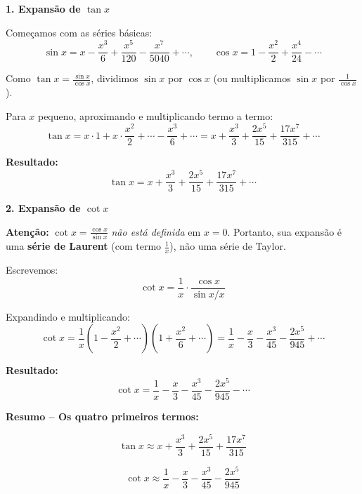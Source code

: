 
\textbf{1. Expansão de $\tan x$}

Começamos com as séries básicas:
\[
\sin x = x - \frac{x^3}{6} + \frac{x^5}{120} - \frac{x^7}{5040}+\cdots,
\qquad
\cos x = 1 - \frac{x^2}{2} + \frac{x^4}{24} - \cdots
\]

Como $\tan x = \frac{\sin x}{\cos x}$, dividimos $\sin x$ por $\cos x$ (ou multiplicamos $\sin x$ por $\frac{1}{\cos x}$). 

Para $x$ pequeno, aproximando e multiplicando termo a termo:
\[
\tan x = x \cdot 1 + x \cdot \frac{x^2}{2} + \cdots - \frac{x^3}{6} + \cdots = x + \frac{x^3}{3} + \frac{2x^5}{15} + \frac{17x^7}{315} + \cdots
\]

\textbf{Resultado:}
\[
\boxed{\tan x = x + \frac{x^3}{3} + \frac{2x^5}{15} + \frac{17x^7}{315} + \cdots}
\]

\textbf{2. Expansão de $\cot x$}

\textbf{Atenção:} $\cot x = \frac{\cos x}{\sin x}$ \emph{não está definida} em $x=0$. Portanto, sua expansão é uma \textbf{série de Laurent} (com termo $\frac{1}{x}$), não uma série de Taylor.

Escrevemos:
\[
\cot x = \frac{1}{x} \cdot \frac{\cos x}{\sin x / x}
\]

Expandindo e multiplicando:
\[
\cot x = \frac{1}{x} \left(1 - \frac{x^2}{2} + \cdots\right)\left(1 + \frac{x^2}{6} + \cdots\right) = \frac{1}{x} - \frac{x}{3} - \frac{x^3}{45} - \frac{2x^5}{945} + \cdots
\]

\textbf{Resultado:}
\[
\boxed{\cot x = \frac{1}{x} - \frac{x}{3} - \frac{x^3}{45} - \frac{2x^5}{945} - \cdots}
\]

\textbf{Resumo – Os quatro primeiros termos:}

\[
\tan x \approx x + \frac{x^3}{3} + \frac{2x^5}{15} + \frac{17x^7}{315}
\]

\[
\cot x \approx \frac{1}{x} - \frac{x}{3} - \frac{x^3}{45} - \frac{2x^5}{945}
\]